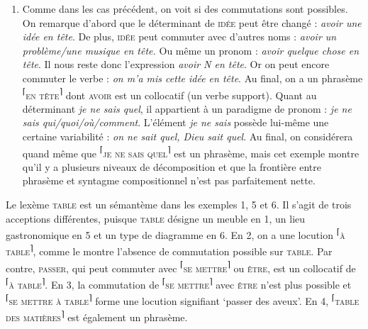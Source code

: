 {\begin{enumerate}
    \item  Comme dans les cas précédent, on voit si des commutations sont possibles. On remarque d’abord que le déterminant de \textsc{idée} peut être changé : \textit{avoir une idée en tête}. De plus, \textsc{idée} peut commuter avec d’autres noms : \textit{avoir un problème/une musique en tête.} Ou même un pronom : \textit{avoir quelque chose en tête}. Il nous reste donc l’expression \textit{avoir N en tête}. Or on peut encore commuter le verbe : \textit{on m’a mis cette idée en tête}. Au final, on a un phrasème \textrm{\textsuperscript{⌈}}\textsc{en} \textsc{tête}\textrm{\textsuperscript{⌉}} dont \textsc{avoir} est un collocatif (un verbe support). Quant au déterminant \textit{je ne sais quel}, il appartient à un paradigme de pronom : \textit{je ne sais qui/quoi/où/comment}. L’élément \textit{je ne sais} possède lui-même une certaine variabilité : \textit{on ne sait quel, Dieu sait quel}. Au final, on considérera quand même que \textrm{\textsuperscript{⌈}}\textsc{je} \textsc{ne} \textsc{sais} \textsc{quel}\textrm{\textsuperscript{⌉}} est un phrasème, mais cet exemple montre qu’il y a plusieurs niveaux de décomposition et que la frontière entre phrasème et syntagme compositionnel n’est pas parfaitement nette.
    \end{enumerate}

     Le lexème \textsc{table} est un sémantème dans les exemples 1, 5 et 6. Il s’agit de trois acceptions différentes, puisque \textsc{table} désigne un meuble en 1, un lieu gastronomique en 5 et un type de diagramme en 6. En 2, on a une locution \textrm{\textsuperscript{⌈}}\textsc{à} \textsc{table}\textrm{\textsuperscript{⌉}}, comme le montre l’absence de commutation possible sur \textsc{table}. Par contre, \textsc{passer}, qui peut commuter avec \textrm{\textsuperscript{⌈}}\textsc{se} \textsc{mettre}\textrm{\textsuperscript{⌉}} ou \textsc{être}, est un collocatif de \textrm{\textsuperscript{⌈}}\textsc{à} \textsc{table}\textrm{\textsuperscript{⌉}}. En 3, la commutation de \textrm{\textsuperscript{⌈}}\textsc{se} \textsc{mettre}\textrm{\textsuperscript{⌉}} avec \textsc{être} n’est plus possible et \textrm{\textsuperscript{⌈}}\textsc{se} \textsc{mettre} \textsc{à} \textsc{table}\textrm{\textsuperscript{⌉}} forme une locution signifiant ‘passer des aveux’. En 4, \textrm{\textsuperscript{⌈}}\textsc{table} \textsc{des} \textsc{matières}\textrm{\textsuperscript{⌉}} est également un phrasème.

}
